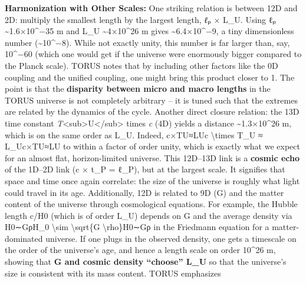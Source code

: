 \documentclass[
]{article}
\begin{document}
\textbf{Harmonization with Other Scales:} One striking relation is
between 12D and 2D: multiply the smallest length by the largest length,
\emph{ℓ}ₚ × L\_U. Using ℓₚ \textasciitilde1.6×10\^{}−35 m and L\_U
\textasciitilde4×10\^{}26 m gives \textasciitilde6.4×10\^{}−9, a tiny
dimensionless number (\textasciitilde10\^{}−8)\hspace{0pt}. While not
exactly unity, this number is far larger than, say, 10\^{}−60 (which one
would get if the universe were enormously bigger compared to the Planck
scale). TORUS notes that by including other factors like the 0D coupling
and the unified coupling, one might bring this product closer to
1\hspace{0pt}. The point is that the \textbf{disparity between micro and
macro lengths} in the TORUS universe is not completely arbitrary -- it
is tuned such that the extremes are related by the dynamics of the
cycle\hspace{0pt}. Another direct closure relation: the 13D time
constant \emph{T}\textless sub\textgreater U\textless/sub\textgreater{}
times \emph{c} (4D) yields a distance \textasciitilde1.3×10\^{}26 m,
which is on the same order as L\_U\hspace{0pt}. Indeed, c×TU≈LUc
\textbackslash times T\_U ≈ L\_Uc×TU\hspace{0pt}≈LU\hspace{0pt} to
within a factor of order unity, which is exactly what we expect for an
almost flat, horizon-limited universe. This 12D--13D link is a
\textbf{cosmic echo} of the 1D--2D link (c × t\_P = ℓ\_P), but at the
largest scale\hspace{0pt}. It signifies that space and time once again
correlate: the size of the universe is roughly what light could travel
in its age. Additionally, 12D is related to 9D (G) and the matter
content of the universe through cosmological equations. For example, the
Hubble length c/H0 (which is of order L\_U) depends on G and the average
density via H0∼GρH\_0 \textbackslash sim \textbackslash sqrt\{G
\textbackslash rho\}H0\hspace{0pt}∼Gρ\hspace{0pt} in the Friedmann
equation for a matter-dominated universe\hspace{0pt}. If one plugs in
the observed density, one gets a timescale on the order of the
universe's age, and hence a length scale on order 10\^{}26 m, showing
that \textbf{G and cosmic density ``choose'' L\_U} so that the
universe's size is consistent with its mass content. TORUS emphasizes
\end{document}
